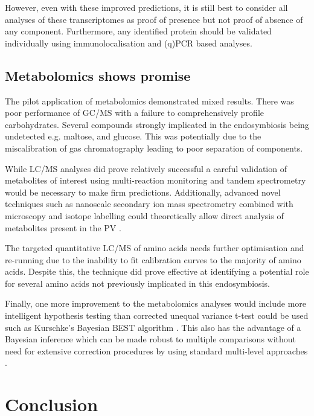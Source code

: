 However, even with these improved predictions, it is still 
best to consider all analyses
of these transcriptomes as proof of presence but not proof of absence
of any component. Furthermore, any identified protein should be validated
individually using immunolocalisation and (q)PCR based analyses.

\subsection{Metabolomics shows promise}

The pilot application of metabolomics demonstrated mixed results.
There was poor performance of GC/MS with a failure to
comprehensively profile carbohydrates. Several 
compounds strongly implicated in the endosymbiosis
being undetected e.g. maltose, and glucose.  This was potentially
due to the miscalibration of gas chromatography leading to poor 
separation of components. 

While LC/MS analyses did prove relatively successful a careful
validation of metabolites of interest using multi-reaction monitoring
and tandem spectrometry would be necessary to make firm predictions.
Additionally, advanced novel techniques such as nanoscale 
secondary ion mass spectrometry combined with 
microscopy and isotope labelling could theoretically allow direct analysis 
of metabolites present in the PV \citep{Kopp2015,Legin2014}.

The targeted quantitative LC/MS of amino acids needs further optimisation
and re-running due to the inability to fit calibration curves to the majority
of amino acids. Despite this, the technique did prove effective at identifying 
a potential role for several amino acids not previously implicated in this
endosymbiosis.

Finally, one more improvement to the metabolomics analyses 
would include more intelligent hypothesis testing than corrected unequal variance t-test
could be used such as Kurschke's Bayesian BEST algorithm \citep{Kruschke2013}.
This also has the advantage of a Bayesian inference which can be 
made robust to multiple comparisons without need for extensive correction
procedures by using standard multi-level approaches \citep{Gelman2009}.


\section{Conclusion}

